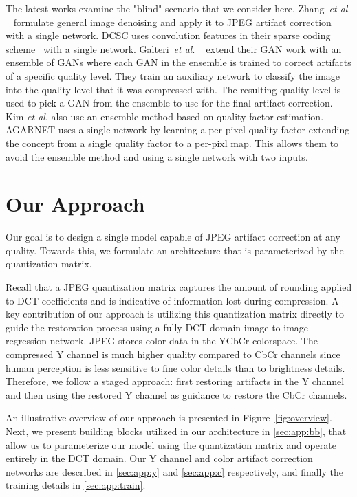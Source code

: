 \documentclass[runningheads]{llncs}
\newcommand{\etal}{\textit{et al}. }
\begin{document}
The latest works examine the "blind" scenario that we consider here. Zhang~\etal~\cite{zhang2017beyond} formulate general image denoising and apply it to JPEG artifact correction with a single network. DCSC uses convolution features in their sparse coding scheme~\cite{fu2019jpeg} with a single network. Galteri~\etal~\cite{galteri2019deep} extend their GAN work with an ensemble of GANs where each GAN in the ensemble is trained to correct artifacts of a specific quality level. They train an auxiliary network to classify the image into the quality level that it was compressed with. The resulting quality level is used to pick a GAN from the ensemble to use for the final artifact correction. Kim \etal \cite{kim2019pseudo} also use an ensemble method based on quality factor estimation. AGARNET \cite{kim2020agarnet} uses a single network by learning a per-pixel quality factor extending the concept \cite{galteri2019deep} from a single quality factor to a per-pixl map. This allows them to avoid the ensemble method and using a single network with two inputs. 
 
\section{Our Approach}

Our goal is to design a single model capable of JPEG artifact correction at any quality. Towards this, we formulate an architecture that is parameterized by the quantization matrix.

Recall that a JPEG quantization matrix captures the amount of rounding applied to DCT coefficients and is indicative of information lost during compression. A key contribution of our approach is utilizing this quantization matrix directly to guide the restoration process using a fully DCT domain image-to-image regression network. JPEG stores color data in the YCbCr colorspace. The compressed Y channel is much higher quality compared to CbCr channels since human perception is less sensitive to fine color details than to brightness details. Therefore, we follow a staged approach: first restoring artifacts in the Y channel and then using the restored Y channel as guidance to restore the CbCr channels. 

An illustrative overview of our approach is presented in Figure~\ref{fig:overview}. 
Next, we present building blocks utilized in our architecture in \ref{sec:app:bb}, that allow us to parameterize our model using the quantization matrix and operate entirely in the DCT domain.  Our Y channel and color artifact correction networks are described in \ref{sec:app:y} and \ref{sec:app:c} respectively, and finally the training details in \ref{sec:app:train}.
\end{document}
